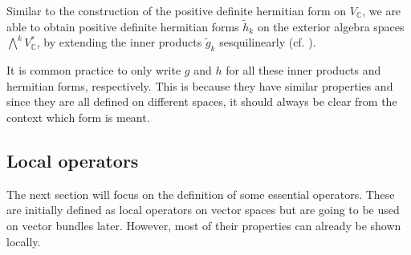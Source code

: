 \begin{rem}
	\label{loc-theory:rem:hermitian-form-on-exterior-algebra}
	Similar to the construction of the positive definite hermitian form on $V_\mathbb{C}$, we are able
	to obtain positive definite hermitian forms $\tilde{h}_k$ on the exterior algebra spaces
	$\bigwedge\nolimits^kV_\mathbb{C}^*$, by extending the inner products $\tilde{g}_k$ sesquilinearly
	(cf. \cite[p.\,33]{Huybrechts2004}).
\end{rem}

\begin{nota}
	It is common practice to only write $g$ and $h$ for all these inner products and hermitian forms,
	respectively. This is because they have similar properties and since they are all defined on different 
	spaces, it should always be clear from the context which form is meant.
\end{nota}

\subsection{Local operators}\;

The next section will focus on the definition of some essential operators. These are initially
defined as local operators on vector spaces but are going to be used on vector bundles later.
However, most of their properties can already be shown locally.

